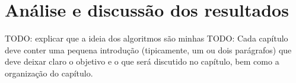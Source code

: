 
\chapter{\larger Análise e discussão dos resultados}


TODO: explicar que a ideia dos algoritmos são minhas
TODO: Cada capítulo deve conter uma pequena introdução (tipicamente, um ou dois parágrafos) que deve deixar claro o objetivo e o que será discutido no capítulo, bem como a organização do capítulo.








